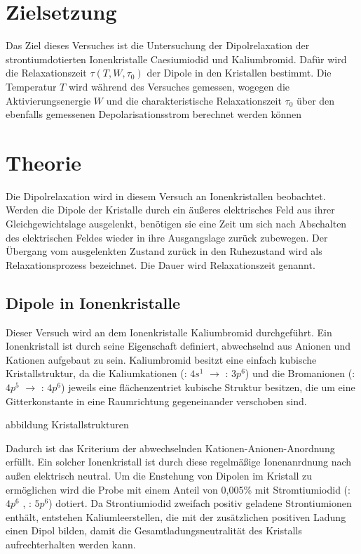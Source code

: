 \section{Zielsetzung}
\label{sec:Zielsetzung}

Das Ziel dieses Versuches ist die Untersuchung der Dipolrelaxation der 
strontiumdotierten Ionenkristalle Caesiumiodid und Kaliumbromid.
Dafür wird die Relaxationszeit $\tau(T,W,\tau_{\text{0}})$ der Dipole in den 
Kristallen bestimmt. Die Temperatur $T$ wird während des Versuches gemessen,
wogegen die Aktivierungsenergie $W$ und die charakteristische Relaxationszeit $\tau_{0}$
über den ebenfalls gemessenen Depolarisationsstrom berechnet werden können

\section{Theorie}
\label{sec:Theorie}

Die Dipolrelaxation wird in diesem Versuch an Ionenkristallen beobachtet.
Werden die Dipole der Kristalle durch ein äußeres elektrisches Feld aus ihrer 
Gleichgewichtslage ausgelenkt, benötigen sie eine Zeit um sich nach Abschalten des 
elektrischen Feldes wieder in ihre Ausgangslage zurück zubewegen. Der Übergang 
vom ausgelenkten Zustand zurück in den Ruhezustand wird als Relaxationsprozess 
bezeichnet. Die Dauer wird Relaxationszeit genannt.

\subsection{Dipole in Ionenkristalle}
\label{sec:Ionenkristalle}

Dieser Versuch wird an dem  Ionenkristalle Kaliumbromid durchgeführt.
Ein Ionenkristall ist durch seine Eigenschaft definiert, abwechselnd aus Anionen
und Kationen aufgebaut zu sein.
Kaliumbromid besitzt eine einfach kubische Kristallstruktur,
da die Kaliumkationen (: $4s^1$ $\to$ : $3p^6$) und die Bromanionen 
(: $4p^5$ $\to$ : $4p^6$)
jeweils eine flächenzentriet kubische Struktur besitzen, die 
um eine Gitterkonstante in eine Raumrichtung gegeneinander verschoben sind. 

abbildung Kristallstrukturen

Dadurch ist das Kriterium der abwechselnden Kationen-Anionen-Anordnung 
erfüllt. Ein solcher Ionenkristall ist durch diese regelmäßige Ionenanrdnung nach außen
elektrisch neutral. Um die Enstehung von Dipolen im Kristall zu ermöglichen wird 
die Probe mit einem Anteil von 0,005\% mit 
Stromtiumiodid (: $4p^6$ , : $5p^6$) dotiert. Da Strontiumiodid zweifach positiv 
geladene Strontiumionen enthält, entstehen Kaliumleerstellen, die mit der 
zusätzlichen positiven Ladung einen Dipol bilden, damit die Gesamtladungsneutralität des
Kristalls aufrechterhalten werden kann. 

